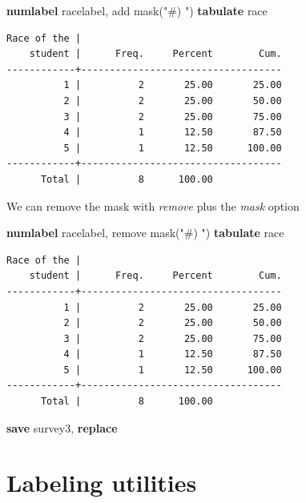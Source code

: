\documentclass[
]{book}
\newenvironment{Shaded}{\begin{snugshade}}{\end{snugshade}}
\newcommand{\KeywordTok}[1]{\textcolor[rgb]{0.13,0.29,0.53}{\textbf{#1}}}
\newcommand{\NormalTok}[1]{#1}
\newcommand{\StringTok}[1]{\textcolor[rgb]{0.31,0.60,0.02}{#1}}
\begin{document}
\begin{Shaded}
\begin{Highlighting}[]
\KeywordTok{numlabel}\NormalTok{ racelabel, add mask(}\StringTok{"\#) "}\NormalTok{)}
\KeywordTok{tabulate}\NormalTok{ race}
\end{Highlighting}
\end{Shaded}

\begin{verbatim}
Race of the |
    student |      Freq.     Percent        Cum.
------------+-----------------------------------
          1 |          2       25.00       25.00
          2 |          2       25.00       50.00
          3 |          2       25.00       75.00
          4 |          1       12.50       87.50
          5 |          1       12.50      100.00
------------+-----------------------------------
      Total |          8      100.00
\end{verbatim}

We can remove the mask with \emph{remove} plus the \emph{mask} option

\begin{Shaded}
\begin{Highlighting}[]
\KeywordTok{numlabel}\NormalTok{ racelabel, remove mask(}\StringTok{"\#) "}\NormalTok{)}
\KeywordTok{tabulate}\NormalTok{ race}
\end{Highlighting}
\end{Shaded}

\begin{verbatim}
Race of the |
    student |      Freq.     Percent        Cum.
------------+-----------------------------------
          1 |          2       25.00       25.00
          2 |          2       25.00       50.00
          3 |          2       25.00       75.00
          4 |          1       12.50       87.50
          5 |          1       12.50      100.00
------------+-----------------------------------
      Total |          8      100.00
\end{verbatim}

\begin{Shaded}
\begin{Highlighting}[]
\KeywordTok{save}\NormalTok{ survey3, }\KeywordTok{replace}
\end{Highlighting}
\end{Shaded}

\section{Labeling utilities}\label{labeling-utilities}
\end{document}
